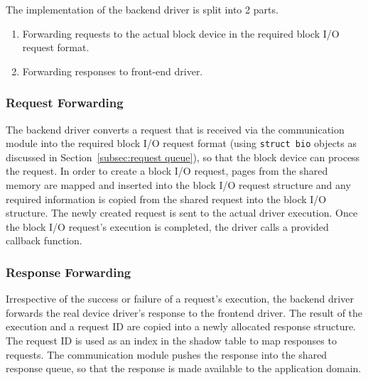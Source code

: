 The implementation of the backend driver is split into 2 parts. 
\begin{enumerate}
\item Forwarding requests to the actual block device in the required block I/O request format. 
\item Forwarding responses to front-end driver.
\end{enumerate}

\subsubsection*{Request Forwarding}
\label{subsec:createbio}
The backend driver converts a request that is received via the
communication module into the required block I/O request format (using \texttt{struct bio} objects
as discussed in Section~\ref{subsec:request queue}), so that the block device
can process the request. In order to create a block I/O request, pages from
the shared memory are mapped and inserted into the block I/O request structure and
any required information is copied from the shared request into the block I/O
structure. The newly created request is sent to the actual driver execution. 
Once the block I/O request's execution is completed, the driver calls a provided
callback function.

\subsubsection*{Response Forwarding}
Irrespective of the success or failure of a request's execution,
the backend driver forwards the real device driver's response to the frontend
driver.  The result of the execution and a request ID are
copied into a newly allocated response structure. The request ID is used
as an index in the shadow table to map responses to requests. The
communication module pushes the response into the shared response queue, 
so that the response is made available to the application domain.

